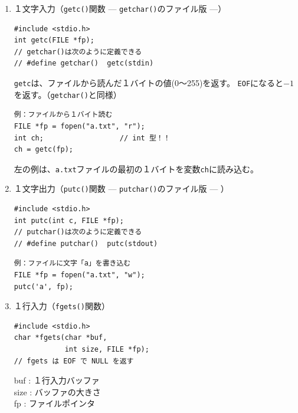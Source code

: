 \documentclass[a4j,dvipdfmx]{jarticle}
\begin{document}
\begin{enumerate}
\begin{enumerate}
\item １文字入力（{\tt getc()}関数 --- {\tt getchar()}のファイル版 ---）

\begin{multicols}{2}
\begin{lstlisting}[numbers=none]
#include <stdio.h>
int getc(FILE *fp);
// getchar()は次のように定義できる
// #define getchar()  getc(stdin)
\end{lstlisting}
\columnbreak

{\tt getc}は、ファイルから読んだ１バイトの値(0〜255)を返す。
{\tt EOF}になると$-1$を返す。（{\tt getchar()}と同様）
\end{multicols}

\begin{multicols}{2}
\begin{lstlisting}[numbers=none]
例：ファイルから１バイト読む
FILE *fp = fopen("a.txt", "r");
int ch;                  // int 型！！
ch = getc(fp);
\end{lstlisting}
\columnbreak

左の例は、{\tt a.txt}ファイルの最初の１バイトを変数{\tt ch}に読み込む。
\end{multicols}

\item １文字出力（{\tt putc()}関数 --- {\tt putchar()}のファイル版 --- ）
\begin{multicols}{2}
\begin{lstlisting}[numbers=none]
#include <stdio.h>
int putc(int c, FILE *fp);
// putchar()は次のように定義できる
// #define putchar()  putc(stdout)
\end{lstlisting}
\columnbreak

\begin{lstlisting}[numbers=none]
例：ファイルに文字「a」を書き込む
FILE *fp = fopen("a.txt", "w");
putc('a', fp);
\end{lstlisting}
\end{multicols}

\item １行入力（{\tt fgets()}関数）

\begin{multicols}{2}
\begin{lstlisting}[numbers=none]
#include <stdio.h>
char *fgets(char *buf,
            int size, FILE *fp);
// fgets は EOF で NULL を返す
\end{lstlisting}
\columnbreak

buf  : １行入力バッファ\\
size : バッファの大きさ\\
fp   : ファイルポインタ
\end{multicols}


\end{enumerate}
\end{enumerate}
\end{document}
